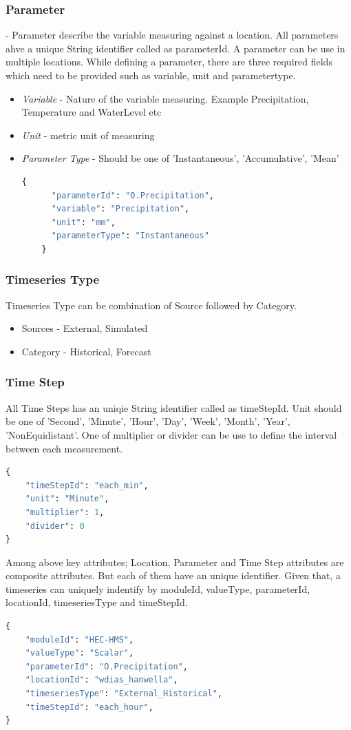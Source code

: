 \subsubsection{Parameter} - Parameter describe the variable measuring against a location. All parameters ahve a unique String identifier called as parameterId. A parameter can be use in multiple locations.
While defining a parameter, there are three required fields which need to be provided such as variable, unit and parametertype.
\begin{itemize}  
  \item \emph{Variable} - Nature of the variable measuring. Example Precipitation, Temperature and WaterLevel etc
  \item \emph{Unit} - metric unit of measuring
  \item \emph{Parameter Type} - Should be one of 'Instantaneous', 'Accumulative', 'Mean'
  \begin{lstlisting}[language=Python]
    {
      "parameterId": "O.Precipitation",
      "variable": "Precipitation",
      "unit": "mm",
      "parameterType": "Instantaneous"
    }
  \end{lstlisting}
\end{itemize}

\subsubsection{Timeseries Type}
Timeseries Type can be combination of Source followed by Category.
\begin{itemize}
  \item Sources - External, Simulated
  \item Category - Historical, Forecast
\end{itemize}

\subsubsection{Time Step}
All Time Steps has an uniqie String identifier called as timeStepId. Unit should be one of 'Second', 'Minute', 'Hour', 'Day', 'Week', 'Month', 'Year', 'NonEquidistant'. One of multiplier or divider can be use to define the interval between each measurement.
\begin{lstlisting}[language=Python]
{
    "timeStepId": "each_min",
    "unit": "Minute",
    "multiplier": 1,
    "divider": 0
}
\end{lstlisting}

Among above key attributes; Location, Parameter and Time Step attributes are composite attributes. But each of them have an unique identifier.
Given that, a timeseries can uniquely indentify by moduleId, valueType, parameterId, locationId, timeseriesType and timeStepId.
\begin{lstlisting}[language=Python]
{
	"moduleId": "HEC-HMS",
	"valueType": "Scalar",
	"parameterId": "O.Precipitation",
	"locationId": "wdias_hanwella",
	"timeseriesType": "External_Historical",
	"timeStepId": "each_hour",
}
\end{lstlisting}

